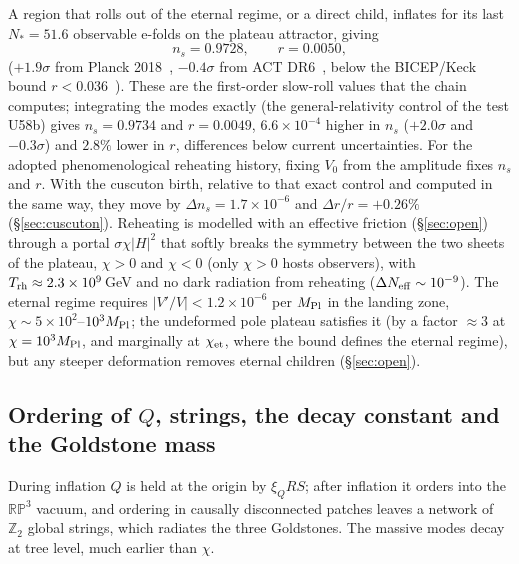 \documentclass[11pt,a4paper]{article}
\newcommand{\RP}{\mathbb{RP}^3}
\newcommand{\Ztwo}{\mathbb{Z}_2}
\newcommand{\Mpl}{M_{\rm Pl}}
\begin{document}
A region that rolls out of the eternal regime, or a direct child, inflates for its last $N_* = 51.6$ observable e-folds on the plateau attractor, giving
\begin{equation}
n_s = 0.9728,\qquad r = 0.0050,
\end{equation}
($+1.9\sigma$ from Planck 2018~\cite{Planck2018X}, $-0.4\sigma$ from ACT DR6~\cite{ACTDR6}, below the BICEP/Keck bound $r<0.036$~\cite{BK18}). These are the first-order slow-roll values that the chain computes; integrating the modes exactly (the general-relativity control of the test U58b) gives $n_s=0.9734$ and $r=0.0049$, $6.6\times10^{-4}$ higher in $n_s$ ($+2.0\sigma$ and $-0.3\sigma$) and $2.8\%$ lower in $r$, differences below current uncertainties.
For the adopted phenomenological reheating history, fixing $V_0$ from the amplitude fixes $n_s$ and $r$. With the cuscuton birth, relative to that exact control and computed in the same way, they move by $\Delta n_s=1.7\times10^{-6}$ and $\Delta r/r=+0.26\%$ (\S\ref{sec:cuscuton}).
Reheating is modelled with an effective friction (\S\ref{sec:open}) through a portal $\sigma\chi|H|^2$ that softly breaks the symmetry between the two sheets of the plateau, $\chi>0$ and $\chi<0$ (only $\chi>0$ hosts observers), with $T_{\rm rh}\approx2.3\times10^{9}$\,GeV and no dark radiation from reheating ($\Delta N_{\rm eff}\sim10^{-9}$).
The eternal regime requires $|V'/V| < 1.2\times10^{-6}$ per $\Mpl$ in the landing zone, $\chi\sim 5\times10^2$--$10^3\Mpl$; the undeformed pole plateau satisfies it (by a factor $\approx3$ at $\chi=10^3\Mpl$, and marginally at $\chi_{\rm et}$, where the bound defines the eternal regime), but any steeper deformation removes eternal children (\S\ref{sec:open}).

\subsection{Ordering of \texorpdfstring{$Q$}{Q}, strings, the decay constant and the Goldstone mass}
\label{sec:F}

During inflation $Q$ is held at the origin by $\xi_Q R S$; after inflation it orders into the $\RP$ vacuum, and ordering in causally disconnected patches leaves a network of $\Ztwo$ global strings, which radiates the three Goldstones.
The massive modes decay at tree level, much earlier than $\chi$.
\end{document}
